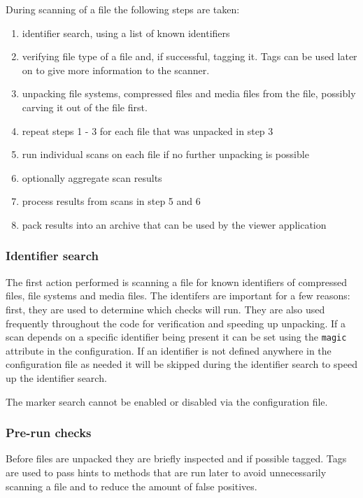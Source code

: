 \documentclass[10pt]{article}
\begin{document}
During scanning of a file the following steps are taken:

\begin{enumerate}
\item identifier search, using a list of known identifiers
\item verifying file type of a file and, if successful, tagging it. Tags can
be used later on to give more information to the scanner.
\item unpacking file systems, compressed files and media files from the file,
possibly carving it out of the file first.
\item repeat steps 1 - 3 for each file that was unpacked in step 3
\item run individual scans on each file if no further unpacking is possible
\item optionally aggregate scan results
\item process results from scans in step 5 and 6
\item pack results into an archive that can be used by the viewer application
\end{enumerate}

\subsubsection{Identifier search}

The first action performed is scanning a file for known identifiers of
compressed files, file systems and media files. The identifers are important
for a few reasons: first, they are used to determine which checks will run. They
are also used frequently throughout the code for verification and speeding up
unpacking. If a scan depends on a specific identifier being present it can be
set using the \texttt{magic} attribute in the configuration. If an identifier
is not defined anywhere in the configuration file as needed it will be skipped
during the identifier search to speed up the identifier search.

The marker search cannot be enabled or disabled via the configuration file.

\subsubsection{Pre-run checks}

Before files are unpacked they are briefly inspected and if possible tagged.
Tags are used to pass hints to methods that are run later to avoid unnecessarily
scanning a file and to reduce the amount of false positives.
\end{document}
